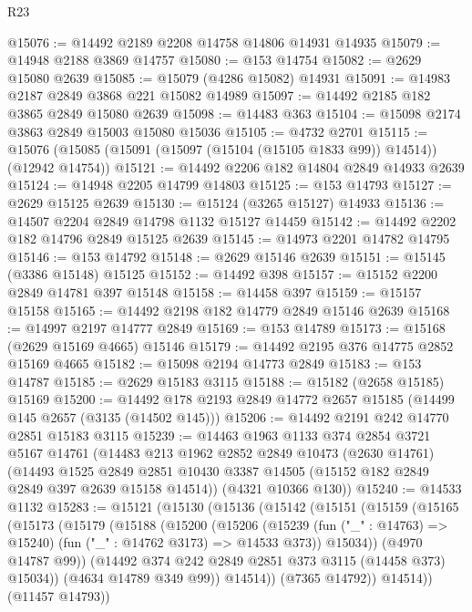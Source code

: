 \begin{lexlean}{R23}
\begin{coremodule}
@15076 := @14492 @2189 @2208 @14758 @14806 @14931 @14935
@15079 := @14948 @2188 @3869 @14757
@15080 := @153 @14754
@15082 := @2629 @15080 @2639
@15085 := @15079 (@4286 @15082) @14931
@15091 := @14983 @2187 @2849 @3868 @221 @15082 @14989
@15097 := @14492 @2185 @182 @3865 @2849 @15080 @2639
@15098 := @14483 @363
@15104 := @15098 @2174 @3863 @2849 @15003 @15080 @15036
@15105 := @4732 @2701
@15115 := @15076 (@15085 (@15091 (@15097 (@15104 (@15105 @1833 @99)) @14514)) (@12942 @14754))
@15121 := @14492 @2206 @182 @14804 @2849 @14933 @2639
@15124 := @14948 @2205 @14799 @14803
@15125 := @153 @14793
@15127 := @2629 @15125 @2639
@15130 := @15124 (@3265 @15127) @14933
@15136 := @14507 @2204 @2849 @14798 @1132 @15127 @14459
@15142 := @14492 @2202 @182 @14796 @2849 @15125 @2639
@15145 := @14973 @2201 @14782 @14795
@15146 := @153 @14792
@15148 := @2629 @15146 @2639
@15151 := @15145 (@3386 @15148) @15125
@15152 := @14492 @398
@15157 := @15152 @2200 @2849 @14781 @397 @15148
@15158 := @14458 @397
@15159 := @15157 @15158
@15165 := @14492 @2198 @182 @14779 @2849 @15146 @2639
@15168 := @14997 @2197 @14777 @2849
@15169 := @153 @14789
@15173 := @15168 (@2629 @15169 @4665) @15146
@15179 := @14492 @2195 @376 @14775 @2852 @15169 @4665
@15182 := @15098 @2194 @14773 @2849
@15183 := @153 @14787
@15185 := @2629 @15183 @3115
@15188 := @15182 (@2658 @15185) @15169
@15200 := @14492 @178 @2193 @2849 @14772 @2657 @15185 (@14499 @145 @2657 (@3135 (@14502 @145)))
@15206 := @14492 @2191 @242 @14770 @2851 @15183 @3115
@15239 := @14463
    @1963
    @1133
    @374
    @2854
    @3721
    @5167
    @14761
    (@14483
      @213
      @1962
      @2852
      @2849
      @10473
      (@2630 @14761)
      (@14493
        @1525
        @2849
        @2851
        @10430
        @3387
        @14505
        (@15152 @182 @2849 @2849 @397 @2639 @15158 @14514))
      (@4321 @10366 @130))
@15240 := @14533 @1132
@15283 := @15121
    (@15130
      (@15136
        (@15142
          (@15151
            (@15159
              (@15165
                (@15173
                  (@15179
                    (@15188
                      (@15200
                        (@15206
                          (@15239
                            (fun ("_" : @14763) => @15240)
                            (fun ("_" : @14762 @3173) => @14533 @373))
                          @15034))
                      (@4970 @14787 @99))
                    (@14492 @374 @242 @2849 @2851 @373 @3115 (@14458 @373) @15034))
                  (@4634 @14789 @349 @99))
                @14514))
            (@7365 @14792))
          @14514))
      (@11457 @14793))

\end{coremodule}
\end{lexlean}
